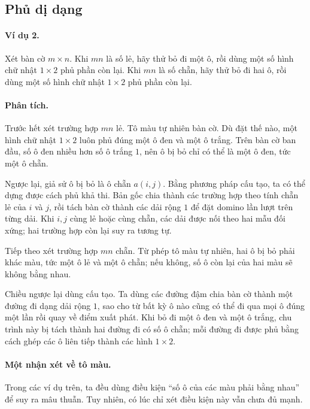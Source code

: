 \documentclass[11pt]{article}
\begin{document}
\subsection{Phủ dị dạng}

\paragraph{Ví dụ 2.}
Xét bàn cờ \(m\times n\). Khi \(mn\) là số lẻ, hãy thử bỏ đi một ô, rồi dùng
một số hình chữ nhật \(1\times2\) phủ phần còn lại. Khi \(mn\) là số chẵn, hãy
thử bỏ đi hai ô, rồi dùng một số hình chữ nhật \(1\times2\) phủ phần còn lại.

\paragraph{Phân tích.}
Trước hết xét trường hợp \(mn\) lẻ. Tô màu tự nhiên bàn cờ. Dù đặt thế nào,
một hình chữ nhật \(1\times2\) luôn phủ đúng một ô đen và một ô trắng. Trên
bàn cờ ban đầu, số ô đen nhiều hơn số ô trắng \(1\), nên ô bị bỏ chỉ có thể
là một ô đen, tức một ô chẵn.

Ngược lại, giả sử ô bị bỏ là ô chẵn \(a(i,j)\). Bằng phương pháp cấu tạo, ta
có thể dựng được cách phủ khả thi. Bản gốc chia thành các trường hợp theo
tính chẵn lẻ của \(i\) và \(j\), rồi tách bàn cờ thành các dải rộng \(1\) để
đặt domino lần lượt trên từng dải. Khi \(i,j\) cùng lẻ hoặc cùng chẵn, các
dải được nối theo hai mẫu đối xứng; hai trường hợp còn lại suy ra tương tự.

Tiếp theo xét trường hợp \(mn\) chẵn. Từ phép tô màu tự nhiên, hai ô bị bỏ
phải khác màu, tức một ô lẻ và một ô chẵn; nếu không, số ô còn lại của hai
màu sẽ không bằng nhau.

Chiều ngược lại dùng cấu tạo. Ta dùng các đường đậm chia bàn cờ thành một
đường đi dạng dải rộng \(1\), sao cho từ bất kỳ ô nào cũng có thể đi qua mọi
ô đúng một lần rồi quay về điểm xuất phát. Khi bỏ đi một ô đen và một ô
trắng, chu trình này bị tách thành hai đường đi có số ô chẵn; mỗi đường đi
được phủ bằng cách ghép các ô liên tiếp thành các hình \(1\times2\).

\paragraph{Một nhận xét về tô màu.}
Trong các ví dụ trên, ta đều dùng điều kiện ``số ô của các màu phải bằng
nhau'' để suy ra mâu thuẫn. Tuy nhiên, có lúc chỉ xét điều kiện này vẫn chưa
đủ mạnh.
\end{document}
